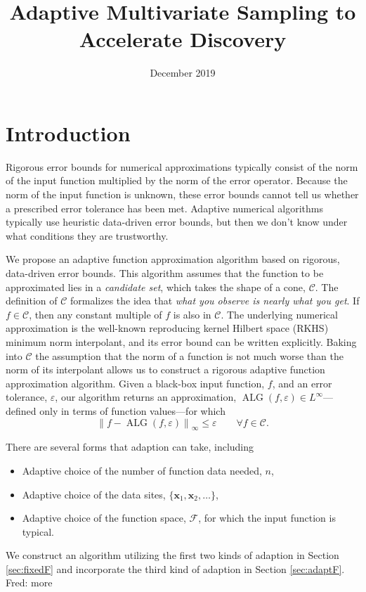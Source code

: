 \documentclass[11pt]{NSFamsart}
\title{Adaptive Multivariate Sampling to Accelerate Discovery}
\author{}
\date{December 2019}
\DeclareMathOperator{\ALG}{ALG}
\newcommand{\bx}{{\boldsymbol{x}}}
\newcommand{\cc}{\mathcal{C}}
\newcommand{\calf}{{\mathcal{F}}}
\newcommand{\norm}[2][{}]{\ensuremath{\left \lVert #2 \right \rVert}_{#1}}
\newcommand{\FredNote}[1]{{\color{blue}Fred: #1}}
\begin{document}
\maketitle

\section{Introduction}
Rigorous error bounds for numerical approximations typically consist of the norm of the input function multiplied by the norm of the error operator.  Because the norm of the input function is unknown, these error bounds cannot tell us whether a prescribed error tolerance has been met.  Adaptive numerical algorithms typically use heuristic data-driven error bounds, but then we don't know under what conditions they are trustworthy.

We propose an adaptive function approximation algorithm based on rigorous, data-driven error bounds.  This algorithm assumes that the function to be approximated lies in a \emph{candidate set}, which takes the shape of a cone, $\cc$.  The definition of $\cc$ formalizes the idea that \emph{what you observe is nearly what you get}.  If $f \in \cc$, then any constant multiple of $f$ is also in $\cc$.  The underlying numerical approximation is the well-known reproducing kernel Hilbert space (RKHS) minimum norm interpolant, and its error bound can be written explicitly.  Baking into $\cc$ the assumption that the norm of a function is not much worse than the norm of its interpolant allows us to construct a rigorous adaptive function approximation algorithm. Given a black-box input function, $f$, and an error tolerance, $\varepsilon$, our algorithm returns an approximation, $\ALG(f,\varepsilon) \in L^\infty$---defined only in terms of function values---for which 
\begin{equation} \label{eq:errorcrit}
\norm[\infty]{f - \ALG(f,\varepsilon)} \le \varepsilon \qquad \forall f\in \cc.
\end{equation}

There are several forms that adaption can take, including
\begin{itemize}
    \item Adaptive choice of the number of function data needed, $n$,
    \item Adaptive choice of the data sites, $\{\bx_1, \bx_2, \ldots\}$,
    \item Adaptive choice of the function space, $\calf$, for which the input function is typical.
\end{itemize}
We construct an algorithm utilizing the first two kinds of adaption in Section \ref{sec:fixedF} and incorporate the third kind of adaption in Section \ref{sec:adaptF}.
\FredNote{more}
\end{document}
